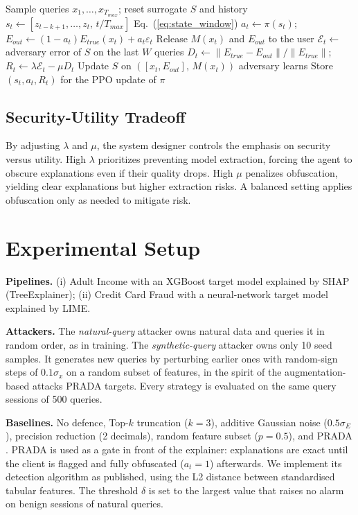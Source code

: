 \documentclass[conference]{IEEEtran}
\begin{document}
\begin{algorithm}[t]
\caption{One training episode (one simulated session)}
\label{alg:training}
\begin{algorithmic}[1]
\STATE Sample queries $x_1,\dots,x_{T_{max}}$; reset surrogate $S$ and history
    \STATE $s_t \leftarrow [z_{t-k+1},\dots,z_t,\,t/T_{max}]$ \hfill Eq.~(\ref{eq:state_window})
    \STATE $a_t \leftarrow \pi(s_t)$;\; $E_{out}\leftarrow(1-a_t)E_{true}(x_t)+a_t\varepsilon_t$
    \STATE Release $M(x_t)$ and $E_{out}$ to the user
    \STATE $\mathcal{E}_t \leftarrow$ adversary error of $S$ on the last $W$ queries
    \STATE $D_t \leftarrow \lVert E_{true}-E_{out}\rVert/\lVert E_{true}\rVert$;\; $R_t \leftarrow \lambda\mathcal{E}_t-\mu D_t$
    \STATE Update $S$ on $([x_t,E_{out}],\,M(x_t))$ \hfill adversary learns
    \STATE Store $(s_t,a_t,R_t)$ for the PPO update of $\pi$
\ENDFOR
\end{algorithmic}
\end{algorithm}

\subsection{Security-Utility Tradeoff}
By adjusting $\lambda$ and $\mu$, the system designer controls the emphasis on security versus utility. High $\lambda$ prioritizes preventing model extraction, forcing the agent to obscure explanations even if their quality drops. High $\mu$ penalizes obfuscation, yielding clear explanations but higher extraction risks. A balanced setting applies obfuscation only as needed to mitigate risk.

\section{Experimental Setup}
\textbf{Pipelines.} (i) Adult Income with an XGBoost target model explained by SHAP (TreeExplainer); (ii) Credit Card Fraud with a neural-network target model explained by LIME.

\textbf{Attackers.} The \emph{natural-query} attacker owns natural data and queries it in random order, as in training. The \emph{synthetic-query} attacker owns only 10 seed samples. It generates new queries by perturbing earlier ones with random-sign steps of $0.1\sigma_x$ on a random subset of features, in the spirit of the augmentation-based attacks PRADA targets. Every strategy is evaluated on the same query sessions of 500 queries.

\textbf{Baselines.} No defence, Top-$k$ truncation ($k=3$), additive Gaussian noise ($0.5\sigma_E$), precision reduction (2 decimals), random feature subset ($p=0.5$), and PRADA \cite{b5}. PRADA is used as a gate in front of the explainer: explanations are exact until the client is flagged and fully obfuscated ($a_t=1$) afterwards. We implement its detection algorithm as published, using the L2 distance between standardised tabular features. The threshold $\delta$ is set to the largest value that raises no alarm on benign sessions of natural queries.
\end{document}
